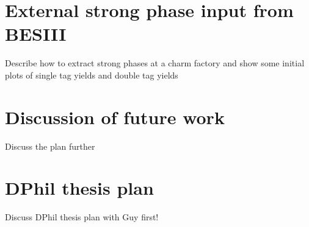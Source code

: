 \documentclass[12pt, a4paper, notitlepage, onecolumn]{article}
\numberwithin{equation}{section}
\begin{document}
\section{External strong phase input from BESIII}
\noindent Describe how to extract strong phases at a charm factory and show some initial plots of single tag yields and double tag yields

\section{Discussion of future work}
\noindent Discuss the plan further





\newpage
\section{DPhil thesis plan}
\noindent Discuss DPhil thesis plan with Guy first!
\end{document}
